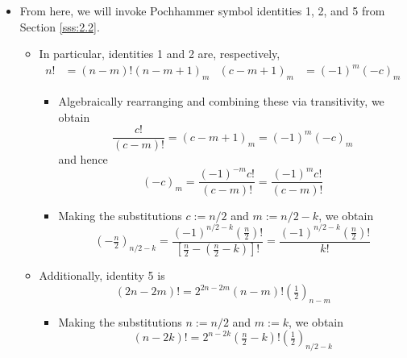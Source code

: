 \documentclass[../finalProject.tex]{subfiles}
\begin{document}
\begin{itemize}
\begin{itemize}
        \item From here, we will invoke Pochhammer symbol identities 1, 2, and 5 from Section \ref{sss:2.2}.
        \begin{itemize}
            \item In particular, identities 1 and 2 are, respectively,
            \begin{align*}
                n! &= (n-m)!(n-m+1)_m&
                (c-m+1)_m &= (-1)^m(-c)_m
            \end{align*}
            \begin{itemize}
                \item Algebraically rearranging and combining these via transitivity, we obtain
                \begin{equation*}
                    \frac{c!}{(c-m)!} = (c-m+1)_m
                    = (-1)^m(-c)_m
                \end{equation*}
                and hence
                \begin{equation*}
                    (-c)_m = \frac{(-1)^{-m}c!}{(c-m)!}
                    = \frac{(-1)^mc!}{(c-m)!}
                \end{equation*}
                \item Making the substitutions $c:=n/2$ and $m:=n/2-k$, we obtain
                \begin{equation*}
                    \left( -\tfrac{n}{2} \right)_{n/2-k} = \frac{(-1)^{n/2-k}\left( \frac{n}{2} \right)!}{\left[ \frac{n}{2}-\left( \frac{n}{2}-k \right) \right]!}
                    = \frac{(-1)^{n/2-k}\left( \frac{n}{2} \right)!}{k!}
                \end{equation*}
            \end{itemize}
            \item Additionally, identity 5 is
            \begin{equation*}
                (2n-2m)! = 2^{2n-2m}(n-m)!\left( \tfrac{1}{2} \right)_{n-m}
            \end{equation*}
            \begin{itemize}
                \item Making the substitutions $n:=n/2$ and $m:=k$, we obtain
                \begin{equation*}
                    (n-2k)! = 2^{n-2k}\left( \tfrac{n}{2}-k \right)!\left( \tfrac{1}{2} \right)_{n/2-k}
                \end{equation*}
            \end{itemize}

\end{itemize}
\end{itemize}
\end{itemize}
\end{document}
